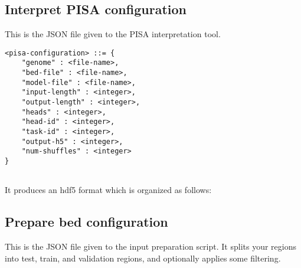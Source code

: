 \documentclass{article}
\begin{document}
\subsection{Interpret PISA configuration}

This is the JSON file given to the PISA interpretation tool. 
\begin{lstlisting}
<pisa-configuration> ::= {
    "genome" : <file-name>,
    "bed-file" : <file-name>,
    "model-file" : <file-name>,
    "input-length" : <integer>,
    "output-length" : <integer>,
    "heads" : <integer>,
    "head-id" : <integer>,
    "task-id" : <integer>,
    "output-h5" : <integer>,
    "num-shuffles" : <integer>
}


\end{lstlisting}



It produces an hdf5 format which is organized as follows:




\subsection{Prepare bed configuration}
This is the JSON file given to the input preparation script. It splits your regions into 
test, train, and validation regions, and optionally applies some filtering. 
\end{document}

